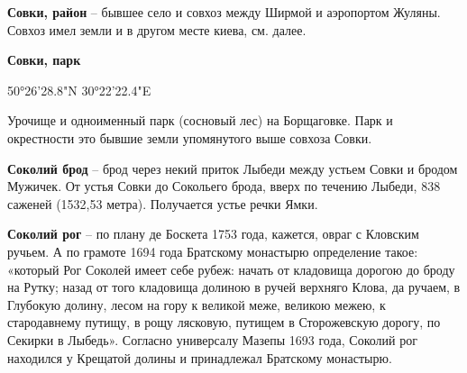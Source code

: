 \medskip

\textbf{Совки, район} – бывшее село и совхоз между Ширмой и аэропортом Жуляны. Совхоз имел земли и в другом месте киева, см. далее.\\

\medskip

\textbf{Совки, парк}

50°26'28.8"N 30°22'22.4"E

Урочище и одноименный парк (сосновый лес) на Борщаговке. Парк и окрестности это бывшие земли упомянутого выше совхоза Совки.

\medskip





\textbf{Соколий брод} – брод через некий приток Лыбеди между устьем Совки и бродом Мужичек. От устья Совки до Сокольего брода, вверх по течению Лыбеди, 838 саженей (1532,53 метра). Получается устье речки Ямки.\\

\medskip

\textbf{Соколий рог} – по плану де Боскета 1753 года, кажется, овраг с Кловским ручьем. А по грамоте 1694 года Братскому монастырю определение такое: «который Рог Соколей имеет себе рубеж: начать от кладовища дорогою до броду на Рутку; назад от того кладовища долиною в ручей верхняго Клова, да ручаем, в Глубокую долину, лесом на гору к великой меже, великою межею, к стародавнему путищу, в рощу лясковую, путищем в Сторожевскую дорогу, по Секирки в Лыбедь». Согласно универсалу Мазепы 1693 года, Соколий рог находился у Крещатой долины и принадлежал Братскому монастырю.\\

